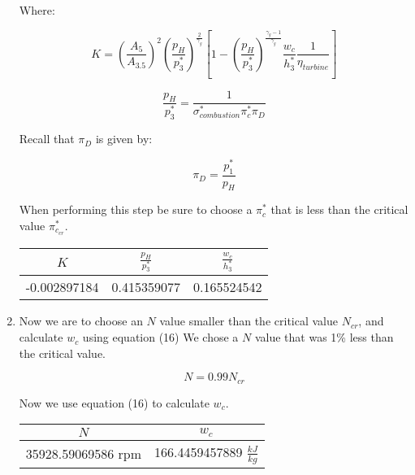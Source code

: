 \documentclass[titlepage]{article}
\begin{document}
\begin{enumerate}
  Where:

  \begin{equation}
    K = \left(\frac{A_{5}}{A_{3.5}}\right)^{2} \left(\frac{p_{H}}{p_{3}^{*}}\right)^{\frac{2}{\gamma_{g}}}\left[1 - \left(\frac{p_{H}}{p_{3}^{*}}\right)^{\frac{\gamma_{g}-1}{\gamma_{g}}} \frac{w_{c}}{h_{3}^{*}} \frac{1}{\eta_{turbine}}\right] 
  \end{equation}

  \begin{equation}
    \frac{p_{H}}{p_{3}^{*}} = \frac{1}{\sigma_{combustion}^{*} \pi_{c}^{*} \pi_{D}}
  \end{equation}

  Recall that $\pi_{D}$ is given by:

  \begin{equation}
    \pi_{D} = \frac{p_{1}^{*}}{p_{H}}
  \end{equation}

  When performing this step be sure to choose a $\pi_{c}^{*}$ that is less than the critical value $\pi_{c_{cr}}^{*}$.

  \begin{center}
    \begin{tabular}{|c|c|c|}
      \hline
      $K$ & $\frac{p_{H}}{p_{3}^{*}}$ & $\frac{w_{c}}{h_{3}^{*}}$ \\
      \hline
      -0.002897184 & 0.415359077 & 0.165524542\\
      \hline
    \end{tabular}
  \end{center}

  \item Now we are to choose an $N$ value smaller than the critical value $N_{cr}$, and calculate $w_{c}$ using equation (16)
  We chose a $N$ value that was 1\% less than the critical value.

  \begin{equation}
    N = 0.99 N_{cr}
  \end{equation}

  Now we use equation (16) to calculate $w_{c}$. 

  \begin{center}
    \begin{tabular}{|c|c|}
      \hline
      $N$ & $w_{c}$ \\
      \hline
      35928.59069586 rpm & 166.4459457889 $\frac{kJ}{kg}$ \\
      \hline
    \end{tabular}
  \end{center}


\end{enumerate}
\end{document}
